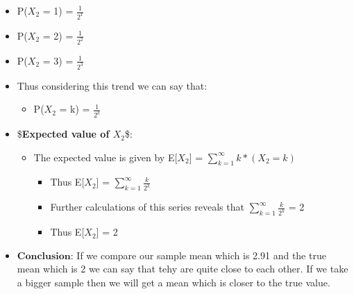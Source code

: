 \documentclass[11pt]{article}
\providecommand{\tightlist}{%
      \setlength{\itemsep}{0pt}\setlength{\parskip}{0pt}}
\begin{document}
\begin{itemize}
\begin{itemize}
    \begin{itemize}
    \item
      P(\(X_2\) = 1) = \(\frac{1}{2^1}\)
    \item
      P(\(X_2\) = 2) = \(\frac{1}{2^2}\)
    \item
      P(\(X_2\) = 3) = \(\frac{1}{2^3}\)
    \item
      Thus considering this trend we can say that:

      \begin{itemize}
      \tightlist
      \item
        P(\(X_2\) = k) = \(\frac{1}{2^k}\)
      \end{itemize}
    \end{itemize}
  \end{itemize}
\end{itemize}

    \begin{itemize}
\item
  \$\textbf{Expected value of $X_2$}\$:

  \begin{itemize}
  \item
    The expected value is given by E{[}\(X_2\){]} =
    \(\sum_{k=1}^{\infty} k*(X_2=k)\)

    \begin{itemize}
    \item
      Thus E{[}\(X_2\){]} = \(\sum_{k=1}^{\infty} \frac{k}{{2^k}}\)
    \item
      Further calculations of this series reveals that
      \(\sum_{k=1}^{\infty} \frac{k}{{2^k}}\) = 2
    \item
      Thus E{[}\(X_2\){]} = 2
    \end{itemize}
  \end{itemize}
\end{itemize}

    \begin{itemize}
\tightlist
\item
  \(\textbf{Conclusion}\): If we compare our sample mean which is 2.91
  and the true mean which is 2 we can say that tehy are quite close to
  each other. If we take a bigger sample then we will get a mean which
  is closer to the true value.
\end{itemize}


    
    
    
    
\end{document}
